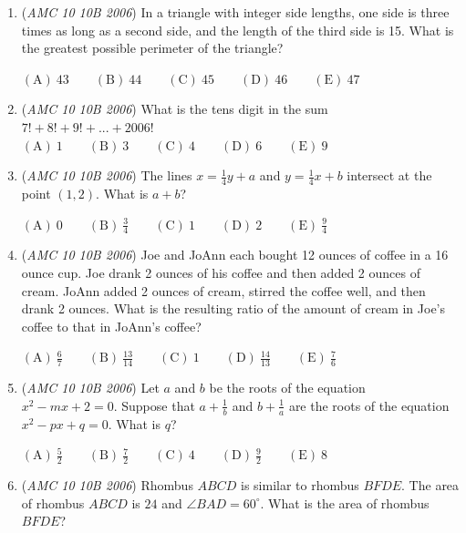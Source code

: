 \begin{enumerate}
 $\mathrm{(A) \ } 129\qquad \mathrm{(B) \ } 137\qquad \mathrm{(C) \ } 174\qquad \mathrm{(D) \ } 233\qquad \mathrm{(E) \ } 411$


	\item (\textit{AMC 10 10B 2006}) In a triangle with integer side lengths, one side is three times as long as a second side, and the length of the third side is 15. What is the greatest possible perimeter of the triangle? 


 $\mathrm{(A) \ } 43\qquad \mathrm{(B) \ } 44\qquad \mathrm{(C) \ } 45\qquad \mathrm{(D) \ } 46\qquad \mathrm{(E) \ } 47$


	\item (\textit{AMC 10 10B 2006}) What is the tens digit in the sum $7!+8!+9!+...+2006!$
$\mathrm{(A) \ } 1\qquad \mathrm{(B) \ } 3\qquad \mathrm{(C) \ } 4\qquad \mathrm{(D) \ } 6\qquad \mathrm{(E) \ } 9$


	\item (\textit{AMC 10 10B 2006}) The lines $x=\frac{1}{4}y+a$ and $y=\frac{1}{4}x+b$ intersect at the point $(1,2)$. What is $a+b$?


 $\mathrm{(A) \ } 0\qquad \mathrm{(B) \ } \frac{3}{4}\qquad \mathrm{(C) \ } 1\qquad \mathrm{(D) \ } 2\qquad \mathrm{(E) \ } \frac{9}{4}$


	\item (\textit{AMC 10 10B 2006}) Joe and JoAnn each bought 12 ounces of coffee in a 16 ounce cup. Joe drank 2 ounces of his coffee and then added 2 ounces of cream. JoAnn added 2 ounces of cream, stirred the coffee well, and then drank 2 ounces. What is the resulting ratio of the amount of cream in Joe's coffee to that in JoAnn's coffee? 


 $\mathrm{(A) \ } \frac{6}{7}\qquad \mathrm{(B) \ } \frac{13}{14}\qquad \mathrm{(C) \ }1 \qquad \mathrm{(D) \ } \frac{14}{13}\qquad \mathrm{(E) \ } \frac{7}{6}$


	\item (\textit{AMC 10 10B 2006}) Let $a$ and $b$ be the roots of the equation $x^2-mx+2=0$. Suppose that $a+\frac{1}{b}$ and $b+\frac{1}{a}$ are the roots of the equation $x^2-px+q=0$. What is $q$?


 $\mathrm{(A) \ } \frac{5}{2}\qquad \mathrm{(B) \ } \frac{7}{2}\qquad \mathrm{(C) \ } 4\qquad \mathrm{(D) \ } \frac{9}{2}\qquad \mathrm{(E) \ } 8$


	\item (\textit{AMC 10 10B 2006}) Rhombus $ABCD$ is similar to rhombus $BFDE$. The area of rhombus $ABCD$ is $24$ and $\angle BAD = 60^\circ$. What is the area of rhombus $BFDE$? 



\end{enumerate}
